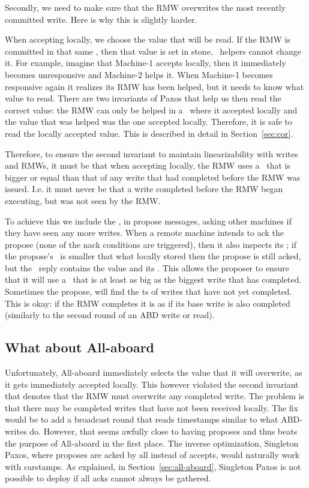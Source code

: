 Secondly, we need to make sure that the RMW overwrites the most recently committed write.
Here is why this is slightly harder.

\custvspace
{}
When accepting locally, we choose the value that will be read. If the RMW is committed in that same \logno, then that value is set in stone, \ie~helpers cannot change it.
For example, imagine that  Machine-1 accepts locally, then it immediately becomes unresponsive and Machine-2 helps it. When Machine-1 becomes responsive again it realizes its RMW has been helped, but it needs to know what value to read. There are two invariants of Paxos that help us then read the correct value: the RMW can only be helped in a \logno~where it accepted locally and the value that was helped was the one accepted locally. Therefore, it is safe to read the locally accepted value. This is described in detail in Section~\ref{sec:cor}.

\custvspace
Therefore, to ensure the second invariant \ie to maintain linearizability with writes and RMWs, it must be that when accepting locally, the RMW uses a \basets~that is bigger or equal than that of any write that had completed before the RMW was issued.
I.e. it must never be that a write completed before the RMW began executing, but was not seen by the RMW.

To achieve this we include the \basets, in propose messages, asking other machines if they have seen any more writes. When a remote machine intends to ack the propose (\ie none of the nack conditions are triggered), then it also inspects its \basets; if the propose's \basets~is smaller that what locally stored then the propose is still acked, but the \ack~reply contains the value and its \basets. This allows the proposer to ensure that it will use a \basets~that is at least as big as the biggest write that has completed. Sometimes the propose, will find the ts of writes that have not yet completed. This is okay: if the RMW completes it is as if its base write is also completed (similarly to the second round of an ABD write or read).

\subsection{What about All-aboard}

Unfortunately, All-aboard immediately selects the value that it will overwrite, as it gets immediately accepted locally. This however violated the second invariant that denotes that the RMW must overwrite any completed write. The problem is that there may be completed writes that have not been received locally.  The fix would be to add a broadcast round that reads timestamps similar to what ABD-writes do. However, that seems awfully close to having proposes and thus beats the purpose of All-aboard in the first place. The inverse optimization, Singleton Paxos, where proposes are acked by all instead of accepts, would naturally work with carstamps. As explained, in Section~\ref{sec:all-aboard}, Singleton Paxos is not possible to deploy if all acks cannot always be gathered.

